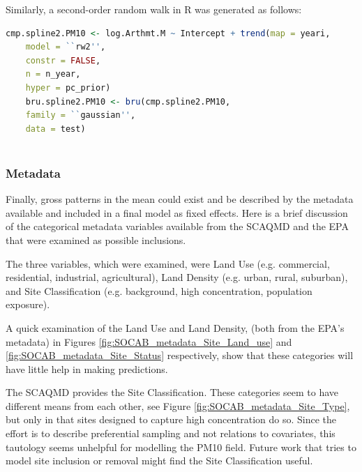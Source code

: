 \documentclass{article}
\begin{document}
Similarly, a second-order random walk in R was generated as follows:
\begin{lstlisting}[language = R]
	cmp.spline2.PM10 <- log.Arthmt.M ~ Intercept + trend(map = yeari,
	model = ``rw2'',
	constr = FALSE,
	n = n_year,
	hyper = pc_prior)
	bru.spline2.PM10 <- bru(cmp.spline2.PM10,
	family = ``gaussian'',
	data = test)
	
\end{lstlisting}

\subsubsection{Metadata}
\label{subsubsec:metadata}
Finally, gross patterns in the mean could exist and be described by the metadata available and included in a final model as fixed effects.  Here is a brief discussion of the categorical metadata variables available from the \ac{SCAQMD} and the \ac{EPA} that were examined as possible inclusions.

The three variables, which were examined,  were Land Use (e.g. commercial, residential, industrial, agricultural), Land Density (e.g. urban, rural, suburban), and Site Classification (e.g. background, high concentration, population exposure).

A quick examination of the Land Use and Land Density, (both from the \ac{EPA}'s metadata) in Figures \ref{fig:SOCAB_metadata_Site_Land_use} and \ref{fig:SOCAB_metadata_Site_Status} respectively, show that these categories will have little help in making predictions.

The \ac{SCAQMD} provides the Site Classification.  These categories seem to have different means from each other, see Figure \ref{fig:SOCAB_metadata_Site_Type}, but only in that sites designed to capture high concentration do so.  Since the effort is to describe preferential sampling and not relations to covariates, this tautology seems unhelpful for modelling the \ac{PM10} field.  Future work that tries to model site inclusion or removal might find the Site Classification useful.  
\end{document}
